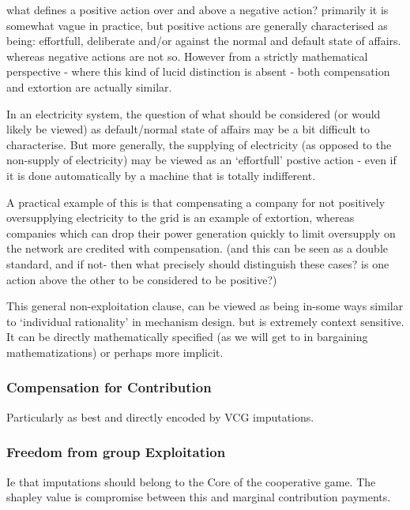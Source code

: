 what defines a positive action over and above a negative action?
primarily it is somewhat vague in practice, but positive actions are generally characterised as being: effortfull, deliberate and/or against the normal and default state of affairs. whereas negative actions are not so.
However from a strictly mathematical perspective - where this kind of lucid distinction is absent - both compensation and extortion are actually similar.

In an electricity system, the question of what should be considered (or would likely be viewed) as default/normal state of affairs may be a bit difficult to characterise.
But more generally, the supplying of electricity (as opposed to the non-supply of electricity) may be viewed as an `effortfull' postive action - even if it is done automatically by a machine that is totally indifferent.

A practical example of this is that compensating a company for not positively oversupplying electricity to the grid is an example of extortion, whereas companies which can drop their power generation quickly to limit oversupply on the network are credited with compensation. (and this can be seen as a double standard, and if not- then what precisely should distinguish these cases? is one action above the other to be considered to be positive?)

This general non-exploitation clause, can be viewed as being in-some ways similar to `individual rationality' in mechanism design. but is extremely context sensitive.
It can be directly mathematically specified (as we will get to in bargaining mathematizations) or perhaps more implicit.





\subsubsection{Compensation for Contribution}

Particularly as best and directly encoded by VCG imputations.

\subsubsection{Freedom from group Exploitation}

Ie that imputations should belong to the Core of the cooperative game.
The shapley value is compromise between this and marginal contribution payments.

